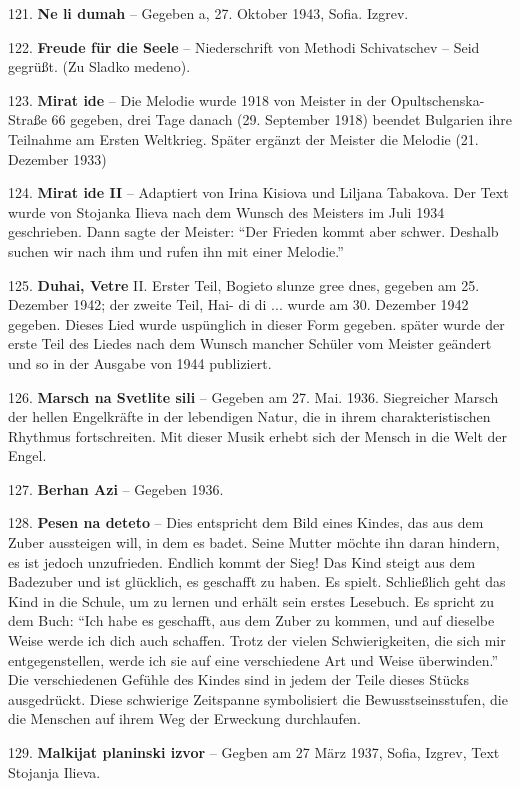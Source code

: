 \documentclass[11pt,a5paper,twoside]{article}
\begin{document}
121. \textbf{Ne li dumah} -- Gegeben a, 27. Oktober 1943, Sofia. Izgrev. 

122. \textbf{Freude für die Seele} -- Niederschrift von Methodi Schivatschev -- Seid gegrüßt. (Zu Sladko medeno).

123. \textbf{Mirat ide} -- Die Melodie wurde 1918 von Meister in der Opultschenska- Straße 66 gegeben, drei Tage danach (29. September 1918) beendet Bulgarien ihre Teilnahme am Ersten Weltkrieg. Später ergänzt der Meister die Melodie (21. Dezember 1933)

124. \textbf{Mirat ide II} -- Adaptiert von Irina Kisiova und Liljana Tabakova. Der Text wurde von Stojanka Ilieva nach dem Wunsch des Meisters im Juli 1934 geschrieben. Dann sagte der Meister: "`Der Frieden kommt aber schwer. Deshalb suchen wir nach ihm und rufen ihn mit einer Melodie."'

125. \textbf{Duhai, Vetre} II. Erster Teil, Bogieto slunze gree dnes, gegeben am 25. Dezember 1942; der zweite Teil, Hai- di di ... wurde am 30. Dezember 1942 gegeben. Dieses Lied wurde uspünglich in dieser Form gegeben. später wurde der erste Teil des Liedes nach dem Wunsch mancher Schüler vom Meister geändert und so in der Ausgabe von 1944 publiziert.

126. \textbf{Marsch na Svetlite sili} -- Gegeben am 27. Mai. 1936. Siegreicher Marsch der hellen Engelkräfte in der lebendigen Natur, die in ihrem charakteristischen Rhythmus fortschreiten. Mit dieser Musik erhebt sich der Mensch in die Welt der Engel.

127. \textbf{Berhan Azi} -- Gegeben 1936.

128. \textbf{Pesen na deteto} -- Dies entspricht dem Bild eines Kindes, das aus dem Zuber aussteigen will, in dem es badet. Seine Mutter möchte ihn daran hindern, es ist jedoch unzufrieden. Endlich kommt der Sieg! Das Kind steigt aus dem Badezuber und ist glücklich, es geschafft zu haben. Es spielt. Schließlich geht das Kind in die Schule, um zu lernen und erhält sein erstes Lesebuch. Es spricht zu dem Buch: "`Ich habe es geschafft, aus dem Zuber zu kommen, und auf dieselbe Weise werde ich dich auch schaffen. Trotz der vielen Schwierigkeiten, die sich mir entgegenstellen, werde ich sie auf eine verschiedene Art und Weise überwinden."'
Die verschiedenen Gefühle des Kindes sind in jedem der Teile dieses Stücks ausgedrückt. Diese schwierige Zeitspanne symbolisiert die Bewusstseinsstufen, die die Menschen auf ihrem Weg der Erweckung durchlaufen.

129. \textbf{Malkijat planinski izvor} -- Gegben am 27 März 1937, Sofia, Izgrev, Text Stojanja Ilieva. 
\end{document}
